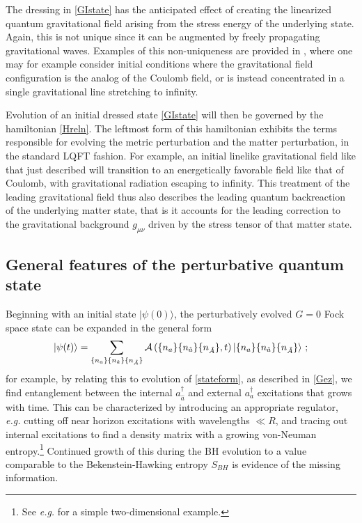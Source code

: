 \documentclass[11pt]{article}
\numberwithin{equation}{section}
\newcommand{\cala}{{\cal A}}
\newcommand{\beq}{\begin{equation}}
\newcommand{\eeq}{\end{equation}}
\begin{document}
The dressing in \eqref{GIstate} has the anticipated effect of creating the linearized quantum gravitational field arising from the stress energy of the underlying state.  Again, this is not unique since it can be augmented by freely propagating gravitational waves.  Examples of this non-uniqueness are provided in \cite{DoGi1}, where one may for example consider initial conditions where the gravitational field configuration is the analog of the Coulomb field, or is instead concentrated in a single gravitational line stretching to infinity.

Evolution of an initial dressed state \eqref{GIstate} will then be governed by the hamiltonian \eqref{Hreln}.  The leftmost form of this hamiltonian exhibits the terms responsible for evolving the metric perturbation and the matter perturbation, in the standard LQFT fashion.  For example, an initial linelike gravitational field like that just described will transition to an energetically favorable field like that of Coulomb, with gravitational radiation escaping to infinity.  This treatment of the leading gravitational field thus also describes the leading quantum backreaction of the underlying matter state, that is it accounts for the leading correction to the gravitational background $g_{\mu\nu}$ driven by the stress tensor of that matter state.



\subsection{General features of the perturbative quantum state}

Beginning with an initial state $|\psi(0)\rangle$, the perturbatively evolved $G=0$ Fock space state can be expanded in the general form 
\beq \label{matstate}
|\psi(t)\rangle = \sum_{\{n_a\}\{n_{\hat a}\}\{n_{\tilde A}\}} \cala\left({\{n_a\}\{n_{\hat a}\}\{n_{\tilde A}\}},t\right)|{\{n_a\}\{n_{\hat a}\}\{n_{\tilde A}\}}\rangle\ ;
\eeq
for example, by relating this to evolution of \eqref{stateform}, as described in \ref{Gez}, we find entanglement between the internal $a^\dagger_{\hat a}$ and external 
$a^\dagger_{a}$ excitations that grows with time.  This can be characterized by introducing an appropriate regulator, {\it e.g.} cutting off near horizon excitations with wavelengths $\ll R$, and tracing out internal excitations to find a density matrix with a growing von-Neuman entropy.\footnote{See {\it e.g.} \cite{GiNe} for a simple two-dimensional example.}  Continued growth of this during the BH evolution to a value comparable to the Bekenstein-Hawking entropy $S_{BH}$ is evidence of the missing information.
\end{document}
